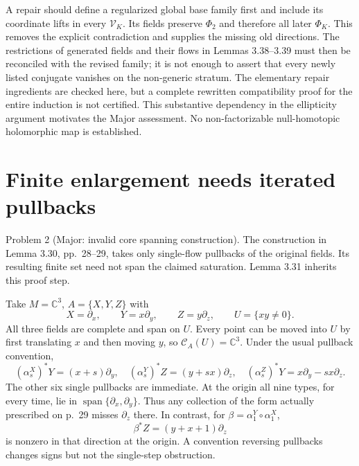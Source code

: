 \documentclass[10pt]{article}
\begin{document}
A repair should define a regularized global base family first and include its coordinate lifts in every \(\mathcal V_K\). Its fields preserve \(\Phi_2\) and therefore all later \(\Phi_K\). This removes the explicit contradiction and supplies the missing old directions. The restrictions of generated fields and their flows in Lemmas 3.38–3.39 must then be reconciled with the revised family; it is not enough to assert that every newly listed conjugate vanishes on the non-generic stratum. The elementary repair ingredients are checked here, but a complete rewritten compatibility proof for the entire induction is not certified. This substantive dependency in the ellipticity argument motivates the Major assessment. No non-factorizable null-homotopic holomorphic map is established.\par
\section*{Finite enlargement needs iterated pullbacks}
Problem 2 (Major: invalid core spanning construction).  The construction in Lemma 3.30, pp. 28–29, takes only single-flow pullbacks of the original fields. Its resulting finite set need not span the claimed saturation. Lemma 3.31 inherits this proof step.\par
Take \(M=\mathbb C^3\), \(A=\{X,Y,Z\}\) with \[X=\partial_x,\qquad Y=x\partial_y,\qquad Z=y\partial_z,
 \qquad U=\{xy\ne0\}.\] All three fields are complete and span on \(U\). Every point can be moved into \(U\) by first translating \(x\) and then moving \(y\), so \(\mathcal C_A(U)=\mathbb C^3\). Under the usual pullback convention, \[(\alpha_s^X)^*Y=(x+s)\partial_y,\quad
 (\alpha_s^Y)^*Z=(y+sx)\partial_z,\quad
 (\alpha_s^Z)^*Y=x\partial_y-sx\partial_z.\] The other six single pullbacks are immediate. At the origin all nine types, for every time, lie in \(\operatorname{span}\{\partial_x,\partial_y\}\). Thus any collection of the form actually prescribed on p. 29 misses \(\partial_z\) there. In contrast, for \(\beta=\alpha_1^Y\circ\alpha_1^X\), \[\beta^*Z=(y+x+1)\partial_z\] is nonzero in that direction at the origin. A convention reversing pullbacks changes signs but not the single-step obstruction.\par
\end{document}
